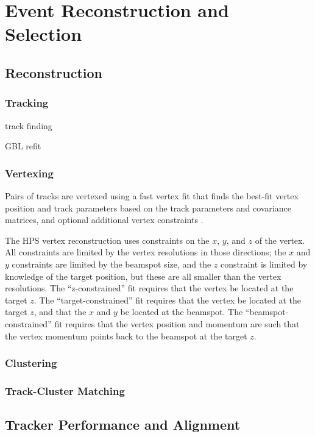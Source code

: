 \chapter{Event Reconstruction and Selection}
\section{Reconstruction}
\subsection{Tracking}
\label{sec:track_recon}
track finding

GBL refit

\subsection{Vertexing}
\label{sec:vertex_recon}
Pairs of tracks are vertexed using a fast vertex fit that finds the best-fit vertex position and track parameters based on the track parameters and covariance matrices, and optional additional vertex constraints \cite{billoir_fast_1992}.

The HPS vertex reconstruction uses constraints on the $x$, $y$, and $z$ of the vertex.
All constraints are limited by the vertex resolutions in those directions; the $x$ and $y$ constraints are limited by the beamspot size, and the $z$ constraint is limited by knowledge of the target position, but these are all smaller than the vertex resolutions.
The ``z-constrained'' fit requires that the vertex be located at the target $z$.
The ``target-constrained'' fit requires that the vertex be located at the target $z$, and that the $x$ and $y$ be located at the beamspot.
The ``beamspot-constrained'' fit requires that the vertex position and momentum are such that the vertex momentum points back to the beamspot at the target $z$.

\subsection{Clustering}
\label{sec:clustering}

\subsection{Track-Cluster Matching}
\label{sec:matching}
\section{Tracker Performance and Alignment}
